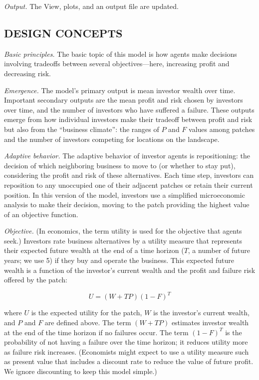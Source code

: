\documentclass[]{article}
\begin{document}
\emph{Output.} The View, plots, and an output file are updated.

\hypertarget{design-concepts}{%
\subsection{DESIGN CONCEPTS}\label{design-concepts}}

\emph{Basic principles.} The basic topic of this model is how agents
make decisions involving tradeoffs between several objectives---here,
increasing profit and decreasing risk.

\emph{Emergence.} The model's primary output is mean investor wealth
over time. Important secondary outputs are the mean profit and risk
chosen by investors over time, and the number of investors who have
suffered a failure. These outputs emerge from how individual investors
make their tradeoff between profit and risk but also from the ``business
climate'': the ranges of \(P\) and \(F\) values among patches and
the number of investors competing for locations on the landscape.

\emph{Adaptive behavior.} The adaptive behavior of investor agents is
repositioning: the decision of which neighboring business to move to (or
whether to stay put), considering the profit and risk of these
alternatives. Each time step, investors can reposition to any unoccupied
one of their adjacent patches or retain their current position. In this
version of the model, investors use a simplified microeconomic analysis
to make their decision, moving to the patch providing the highest value
of an objective function.

\emph{Objective.} (In economics, the term utility is used for the
objective that agents seek.) Investors rate business alternatives by a
utility measure that represents their expected future wealth at the end
of a time horizon (\(T\), a number of future years; we use 5) if they
buy and operate the business. This expected future wealth is a function
of the investor's current wealth and the profit and failure risk offered
by the patch:

$$
U = (W + TP) (1 - F)^T
$$

where \(U\) is the expected utility for the patch, \(W\) is the
investor's current wealth, and \(P\) and \(F\) are defined above.
The term $(W + TP)$ estimates investor wealth at the end of
the time horizon if no failures occur. The term \((1 - F)^T\)
is the probability of not having a failure over the time horizon; it
reduces utility more as failure risk increases. (Economists might expect
to use a utility measure such as present value that includes a discount
rate to reduce the value of future profit. We ignore discounting to keep
this model simple.)
\end{document}
